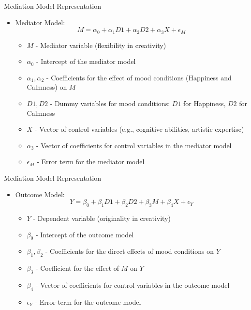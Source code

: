\documentclass[pdf]{beamer}
\begin{document}
\begin{frame}{Mediation Model Representation}
\begin{itemize}
    \item Mediator Model:
    \[ M = \alpha_0 + \alpha_1 D1 + \alpha_2 D2 + \alpha_3 X + \epsilon_M \]
    \begin{itemize}
        \item \( M \) - Mediator variable (flexibility in creativity)
        \item \( \alpha_0 \) - Intercept of the mediator model
        \item \( \alpha_1, \alpha_2 \) - Coefficients for the effect of mood conditions (Happiness and Calmness) on \( M \)
        \item \( D1, D2 \) - Dummy variables for mood conditions: \( D1 \) for Happiness, \( D2 \) for Calmness
        \item \( X \) - Vector of control variables (e.g., cognitive abilities, artistic expertise)
        \item \( \alpha_3 \) - Vector of coefficients for control variables in the mediator model
        \item \( \epsilon_M \) - Error term for the mediator model
    \end{itemize}
\end{itemize}
\end{frame}

\begin{frame}{Mediation Model Representation}
\begin{itemize}
\item Outcome Model:
    \[ Y = \beta_0 + \beta_1 D1 + \beta_2 D2 + \beta_3 M + \beta_4 X + \epsilon_Y \]
    \begin{itemize}
        \item \( Y \) - Dependent variable (originality in creativity)
        \item \( \beta_0 \) - Intercept of the outcome model
        \item \( \beta_1, \beta_2 \) - Coefficients for the direct effects of mood conditions on \( Y \)
        \item \( \beta_3 \) - Coefficient for the effect of \( M \) on \( Y \)
        \item \( \beta_4 \) - Vector of coefficients for control variables in the outcome model
        \item \( \epsilon_Y \) - Error term for the outcome model
    \end{itemize}
\end{itemize}
\end{frame}
\end{document}
